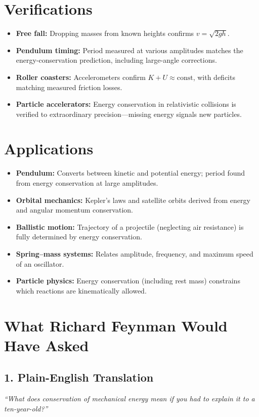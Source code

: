 \documentclass[11pt,openright]{book}
\begin{document}
\section*{Verifications}

\begin{itemize}
\item \textbf{Free fall:} Dropping masses from known heights confirms $v = \sqrt{2gh}$.
\item \textbf{Pendulum timing:} Period measured at various amplitudes matches the energy-conservation prediction, including large-angle corrections.
\item \textbf{Roller coasters:} Accelerometers confirm $K + U \approx \text{const}$, with deficits matching measured friction losses.
\item \textbf{Particle accelerators:} Energy conservation in relativistic collisions is verified to extraordinary precision---missing energy signals new particles.
\end{itemize}
\section*{Applications}

\begin{itemize}
\item \textbf{Pendulum:} Converts between kinetic and potential energy; period found from energy conservation at large amplitudes.
\item \textbf{Orbital mechanics:} Kepler's laws and satellite orbits derived from energy and angular momentum conservation.
\item \textbf{Ballistic motion:} Trajectory of a projectile (neglecting air resistance) is fully determined by energy conservation.
\item \textbf{Spring--mass systems:} Relates amplitude, frequency, and maximum speed of an oscillator.
\item \textbf{Particle physics:} Energy conservation (including rest mass) constrains which reactions are kinematically allowed.
\end{itemize}
\section*{What Richard Feynman Would Have Asked}

\subsection*{1. Plain-English Translation}
\textit{``What does conservation of mechanical energy mean if you had to explain it to a ten-year-old?''}
\end{document}
